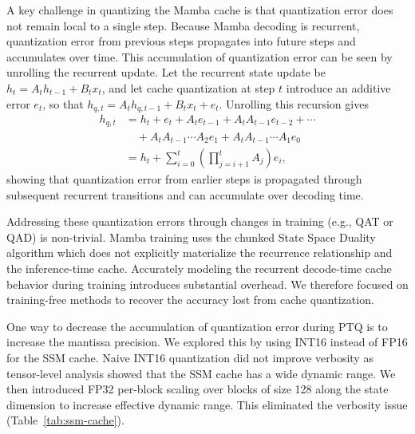 A key challenge in quantizing the Mamba cache is that quantization error does not remain local to a single step. Because Mamba decoding is recurrent, quantization error from previous steps propagates into future steps and accumulates over time. 
This accumulation of quantization error can be seen by unrolling the recurrent update. Let the recurrent state update be \(h_t = A_t h_{t-1} + B_t x_t\), and let cache quantization at step \(t\) introduce an additive error \(e_t\), so that \(h_{q,t} = A_t h_{q,t-1} + B_t x_t + e_t\). Unrolling this recursion gives
\begin{align}
h_{q,t} &= h_t + e_t + A_t e_{t-1} + A_tA_{t-1}e_{t-2} + \cdots \nonumber\\
&\quad + A_tA_{t-1}\cdots A_2 e_1 + A_tA_{t-1}\cdots A_1 e_0 \nonumber\\
&= h_t + \sum_{i=0}^{t} \left( \prod_{j=i+1}^{t} A_j \right) e_i,
\end{align}
showing that quantization error from earlier steps is propagated through subsequent recurrent transitions and can accumulate over decoding time.

Addressing these quantization errors through changes in training (e.g., QAT or QAD) is non-trivial. Mamba training uses the chunked State Space Duality algorithm which does not explicitly materialize the recurrence relationship and the inference-time cache. Accurately modeling the recurrent decode-time cache behavior during training introduces substantial overhead. We therefore focused on training-free methods to recover the accuracy lost from cache quantization.

One way to decrease the accumulation of quantization error during PTQ is to increase the mantissa precision.
We explored this by using INT16 instead of FP16 for the SSM cache.
Naive INT16 quantization did not improve verbosity as tensor-level analysis showed that the SSM cache has a wide dynamic range. We then introduced FP32 per-block scaling over blocks of size 128 along the state dimension to increase effective dynamic range. This eliminated the verbosity issue (Table~\ref{tab:ssm-cache}).

